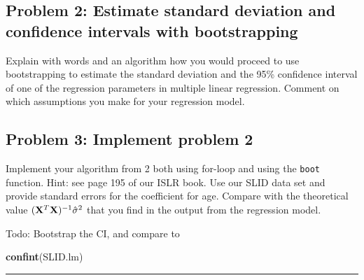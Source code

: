 \documentclass[]{article}
\newenvironment{Shaded}{\begin{snugshade}}{\end{snugshade}}
\newcommand{\KeywordTok}[1]{\textcolor[rgb]{0.13,0.29,0.53}{\textbf{#1}}}
\newcommand{\DataTypeTok}[1]{\textcolor[rgb]{0.13,0.29,0.53}{#1}}
\newcommand{\DecValTok}[1]{\textcolor[rgb]{0.00,0.00,0.81}{#1}}
\newcommand{\StringTok}[1]{\textcolor[rgb]{0.31,0.60,0.02}{#1}}
\newcommand{\OperatorTok}[1]{\textcolor[rgb]{0.81,0.36,0.00}{\textbf{#1}}}
\newcommand{\NormalTok}[1]{#1}
\begin{document}
\subsection{Problem 2: Estimate standard deviation and confidence
intervals with
bootstrapping}\label{problem-2-estimate-standard-deviation-and-confidence-intervals-with-bootstrapping}

Explain with words and an algorithm how you would proceed to use
bootstrapping to estimate the standard deviation and the 95\% confidence
interval of one of the regression parameters in multiple linear
regression. Comment on which assumptions you make for your regression
model.

\subsection{Problem 3: Implement problem
2}\label{problem-3-implement-problem-2}

Implement your algorithm from 2 both using for-loop and using the
\texttt{boot} function. Hint: see page 195 of our ISLR book. Use our
SLID data set and provide standard errors for the coefficient for age.
Compare with the theoretical value
\(({\bf X}^T{\bf X})^{-1}\hat{\sigma}^2\) that you find in the output
from the regression model.

\begin{Shaded}
\end{Shaded}

Todo: Bootstrap the CI, and compare to

\begin{Shaded}
\begin{Highlighting}[]
\KeywordTok{confint}\NormalTok{(SLID.lm)}
\end{Highlighting}
\end{Shaded}

\begin{center}\rule{0.5\linewidth}{\linethickness}\end{center}
\end{document}
